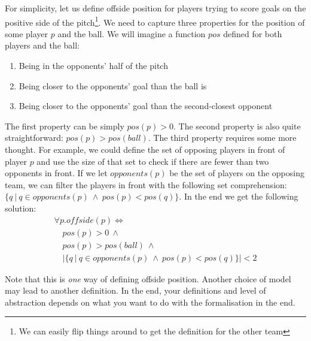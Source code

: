 \documentclass{tufte-handout}
\newcounter{example}
\begin{document}
\begin{enumerate}
  For simplicity, let us define offside position for players
  trying to score goals on the positive side of the
  pitch\footnote{We can easily flip things around to get the
    definition for the other team}. We need to capture three
  properties for the position of some player $p$ and the ball. We
  will imagine a function $\mathit{pos}$ defined for both players
  and the ball:
  \begin{enumerate}
  \item Being in the opponents' half of the pitch
  \item Being closer to the opponents' goal than the ball is
  \item Being closer to the opponents' goal than the
    second-closest opponent
  \end{enumerate}
  The first property can be simply $\mathit{pos}(p) > 0$.
%
  The second property is also quite straightforward:
  $\mathit{pos}(p) > \mathit{pos}(\mathit{ball})$.
%
  The third property requires some more thought. For example, we
  could define the set of opposing players in front of player $p$
  and use the size of that set to check if there are fewer than
  two opponents in front. If we let $\mathit{opponents}(p)$ be the
  set of players on the opposing team, we can filter the players
  in front with the following set comprehension:
  $\{q~|~q\in\mathit{opponents}(p) ~\land~ pos(p)<pos(q)\}$. In
  the end we get the following solution:
\[
  \begin{array}{l}
    \forall p. \mathit{offside}(p) \iff\\
    \quad \mathit{pos}(p) > 0 ~\land\\
    \quad \mathit{pos}(p) > \mathit{pos}(\mathit{ball}) ~\land\\
    \quad \left|\{q~|~q\in\mathit{opponents}(p) ~\land~ pos(p)<pos(q)\}\right| < 2
  \end{array}
\]




Note that this is \emph{one} way of defining offside position.
Another choice of model may lead to another definition. In the
end, your definitions and level of abstraction depends on what you
want to do with the formalisation in the end.
\end{enumerate}
\end{document}
